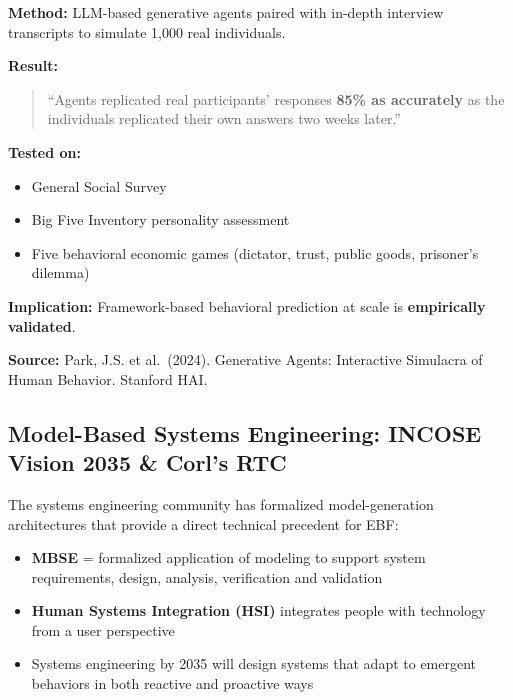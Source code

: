 \begin{tcolorbox}[colback=green!5!white, colframe=green!75!black,
    title=\textbf{Park et al.\ (2024): Simulating Human Behavior with AI Agents}]

\textbf{Method:} LLM-based generative agents paired with in-depth interview transcripts
to simulate 1,000 real individuals.

\textbf{Result:}
\begin{quote}
``Agents replicated real participants' responses \textbf{85\% as accurately} as the
individuals replicated their own answers two weeks later.''
\end{quote}

\textbf{Tested on:}
\begin{itemize}[nosep]
    \item General Social Survey
    \item Big Five Inventory personality assessment
    \item Five behavioral economic games (dictator, trust, public goods, prisoner's dilemma)
\end{itemize}

\textbf{Implication:} Framework-based behavioral prediction at scale is \textbf{empirically validated}.

\textbf{Source:} Park, J.S. et al.\ (2024). Generative Agents: Interactive Simulacra of Human Behavior.
Stanford HAI.

\end{tcolorbox}

\subsection{Model-Based Systems Engineering: INCOSE Vision 2035 \& Corl's RTC}

The systems engineering community has formalized model-generation architectures that
provide a direct technical precedent for EBF:

\begin{itemize}
    \item \textbf{MBSE} = formalized application of modeling to support system requirements,
        design, analysis, verification and validation
    \item \textbf{Human Systems Integration (HSI)} integrates people with technology
        from a user perspective
    \item Systems engineering by 2035 will design systems that adapt to emergent
        behaviors in both reactive and proactive ways
\end{itemize}

